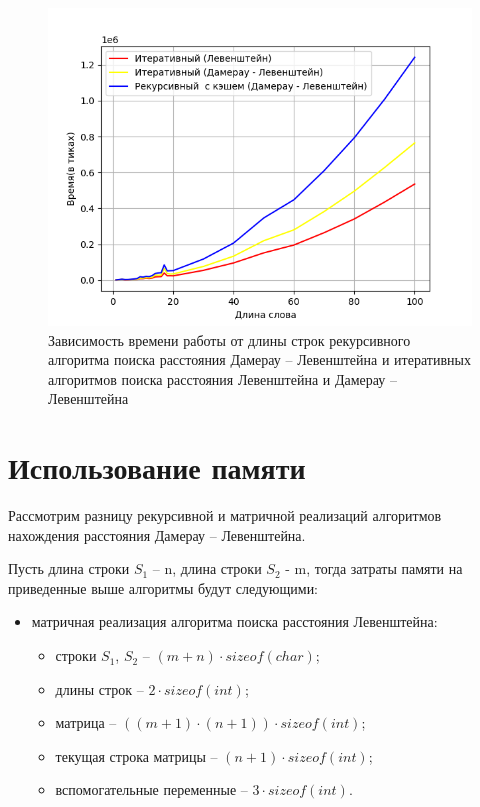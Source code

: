 \begin{figure}[h]
	\centering
	\includegraphics[width=140mm]{result3}
	\caption{Зависимость времени работы от длины строк рекурсивного алгоритма поиска расстояния Дамерау -- Левенштейна и  итеративных алгоритмов поиска расстояния Левенштейна и Дамерау -- Левенштейна}
	\label{img:result3}
\end{figure}


\clearpage
\newpage
\section{Использование памяти}

Рассмотрим разницу рекурсивной и матричной реализаций алгоритмов нахождения расстояния Дамерау -- Левенштейна.

Пусть длина строки $S_{1}$ -- n, длина строки $S_{2}$ - m, тогда затраты памяти на приведенные выше алгоритмы будут следующими:
\begin{itemize}
	\item матричная реализация алгоритма поиска расстояния Левенштейна:\begin{itemize}
		\item строки $S_{1}$, $S_{2}$ -- $(m + n) \cdot sizeof(char)$;
		\item длины строк -- $2 \cdot sizeof(int)$;
		\item матрица -- $((m + 1) \cdot (n + 1)) \cdot sizeof(int)$;
		\item текущая строка матрицы -- $(n + 1) \cdot sizeof(int)$;
		\item вспомогательные переменные --  $3 \cdot sizeof(int)$.
	\end{itemize}
\end{itemize}

